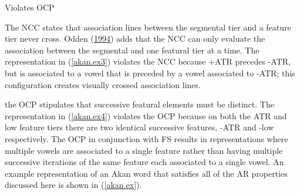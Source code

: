 \documentclass[,doc,floatsintext]{apa6}
\theoremstyle{definition}
\theoremstyle{definition}
\theoremstyle{definition}
\theoremstyle{remark}
\begin{document}
\begin{exe}
\ex \label{ocp.ex} Violates OCP
\end{exe}

The NCC states that association lines between the segmental tier and a
feature tier never cross. Odden
(\protect\hyperlink{ref-odden1994}{1994}) adds that the NCC can only
evaluate the association between the segmental and one featural tier at
a time. The representation in (\ref{akan.ex3}) violates the NCC because
+ATR precedes -ATR, but is associated to a vowel that is preceded by a
vowel associated to -ATR; this configuration creates visually crossed
association lines.

the OCP stipulates that successive featural elements must be distinct.
The representation in (\ref{akan.ex4}) violates the OCP because on both
the ATR and low feature tiers there are two identical successive
features, -ATR and -low respectively. The OCP in conjunction with FS
results in representations where multiple vowels are associated to a
single feature rather than having multiple successive iterations of the
same feature each associated to a single vowel. An example
representation of an Akan word that satisfies all of the AR properties
discussed here is shown in (\ref{akan.ex}).
\end{document}
